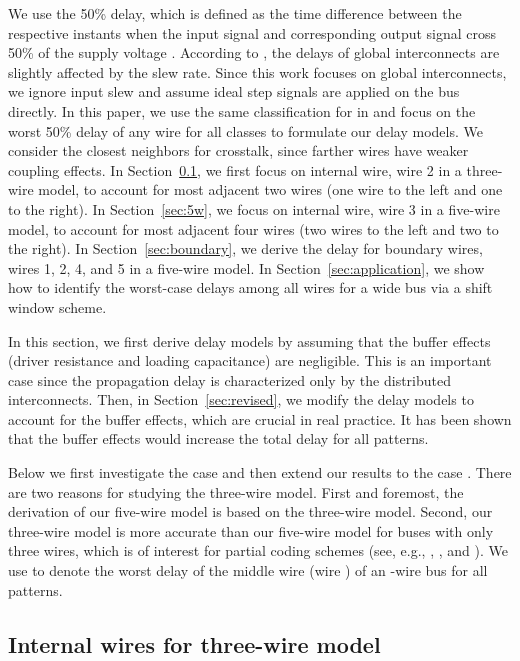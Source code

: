 \documentclass[10pt,journal]{IEEEtran}
\begin{document}
We use the 50\% delay, which is defined as the time difference between the respective instants when the input signal and corresponding output signal cross 50\% of the supply voltage . According to \cite{Kah99}, the delays of global interconnects are slightly affected by the slew rate. Since this work focuses on global interconnects, we ignore input slew and assume ideal step signals are applied on the bus directly. In this paper, we use the same classification  for  in \cite{Sot01} and focus on the worst 50\% delay of any wire for all classes to formulate our delay models.
We consider the closest neighbors for crosstalk, since farther wires have weaker coupling effects.
In Section~\ref{sec:3m}, we first focus on internal wire, wire 2 in a three-wire model, to account for most adjacent two wires (one wire to the left and one to the right). In Section~\ref{sec:5w}, we focus on internal wire, wire 3 in a five-wire model, to account for most adjacent four wires (two wires to the left and two to the right).
In Section~\ref{sec:boundary}, we derive the delay for boundary wires, wires 1, 2, 4, and 5 in a five-wire model.
In Section~\ref{sec:application}, we show how to identify the worst-case delays among all wires for a wide bus via a shift window scheme.


In this section, we first derive delay models by assuming that the buffer effects (driver resistance and loading capacitance) are negligible. This is an important case since the propagation delay is characterized only by the distributed interconnects. Then, in Section~\ref{sec:revised}, we modify the delay models to account for the buffer effects, which are crucial in real practice. It has been shown that the buffer effects would increase the total delay for all patterns.


Below we first investigate the case  and then extend our results to the case . There are two reasons for studying the three-wire model. First and foremost, the derivation of our five-wire model is based on the three-wire model. Second, our three-wire model is more accurate than our five-wire model for buses with only three wires, which is of interest for partial coding schemes (see, e.g., \cite{Dua01}, \cite{Vic01}, and \cite{Sri07}).
We use  to denote the worst delay of the middle wire (wire ) of an -wire bus for all  patterns.

\subsection{Internal wires for three-wire model}
\label{sec:3m}
\end{document}
